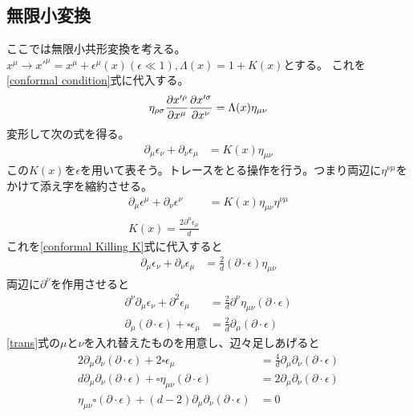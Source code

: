 \documentclass[11pt, dvipdfmx]{article}
\numberwithin{equation}{section}
\begin{document}
\subsection{無限小変換}
ここでは無限小共形変換を考える。$x^\mu \to x'^\mu = x^\mu + \epsilon^\mu(x) (\epsilon\ll1),\Lambda(x)=1+K(x)$とする。
これを\eqref{conformal condition}式に代入する。
\begin{align}
    \eta_{\rho \sigma}\pdv{x'^\rho}{x^\mu}\pdv{x'^\sigma}{x^\nu} &= \Lambda(x) \eta_{\mu\nu}\\
\end{align}
変形して次の式を得る。
\begin{align}
    \partial_\mu \epsilon_\nu + \partial_\nu \epsilon_\mu &= K(x) \eta_{\mu\nu}\label{conformal Killing K}
\end{align}
この$K(x)$を$\epsilon$を用いて表そう。トレースをとる操作を行う。つまり両辺に$\eta^{\nu\mu}$をかけて添え字を縮約させる。
\begin{align}
    \partial_\mu \epsilon^\mu + \partial_\nu \epsilon^\nu &= K(x) \eta_{\mu\nu}\eta^{\nu\mu}\\
    K(x)=\frac{2\partial^\mu\epsilon_\mu}{d}
\end{align}
これを\eqref{conformal Killing K}式に代入すると
\begin{align}
    \partial_\mu \epsilon_\nu + \partial_\nu \epsilon_\mu &= \frac{2}{d}(\partial\cdot\epsilon)\eta_{\mu\nu}\label{conformal Killing}
\end{align}
両辺に$\partial^\nu$を作用させると
\begin{align}
    \partial^\nu\partial_\mu \epsilon_\nu + \partial^2 \epsilon_\mu &= \frac{2}{d}\partial^\nu\eta_{\mu\nu}(\partial\cdot\epsilon)\\
    \partial_\mu(\partial\cdot\epsilon) + \square \epsilon_\mu &= \frac{2}{d}\partial_\mu(\partial\cdot\epsilon)\label{trans}
\end{align}
\eqref{trans}式の$\mu$と$\nu$を入れ替えたものを用意し、辺々足しあげると
\begin{align}
    2\partial_\mu\partial_\nu(\partial\cdot\epsilon) + 2\square \epsilon_\mu &= \frac{4}{d}\partial_\mu\partial_\nu(\partial\cdot\epsilon)\\
    d \partial_\mu\partial_\nu(\partial\cdot\epsilon) + \square \eta_{\mu\nu}(\partial \cdot \epsilon) &= 2\partial_\mu\partial_\nu(\partial\cdot\epsilon)\\
    \eta_{\mu\nu}\square(\partial\cdot\epsilon) +(d-2)\partial_\mu\partial_\nu(\partial\cdot\epsilon)&=0\label{conformal Killing d-2}
\end{align}
\end{document}
